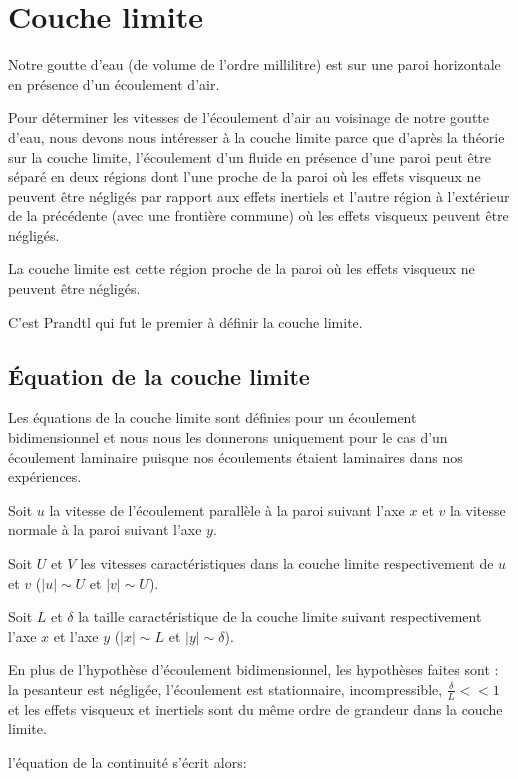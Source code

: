 \documentclass[french]{article}
\begin{document}
 
\section{Couche limite}
Notre goutte d'eau (de volume de l'ordre millilitre) est sur une paroi horizontale en présence d'un écoulement d'air.


Pour déterminer les vitesses de l'écoulement d'air au voisinage de notre goutte d'eau, nous devons nous intéresser à la couche limite parce que d'après la théorie sur la couche limite, l'écoulement d'un fluide en présence d'une paroi peut être séparé en deux régions dont l'une proche de la paroi où les effets visqueux ne peuvent être négligés par rapport aux effets inertiels et l'autre région à l'extérieur de la précédente (avec une frontière commune) où les effets visqueux peuvent être négligés.

La couche limite est cette région proche de la paroi où les effets visqueux ne peuvent être négligés.

C'est Prandtl qui fut le premier à définir la couche limite. 

\subsection{Équation de la couche limite }

Les équations de la couche limite sont définies pour un écoulement bidimensionnel et nous nous les donnerons uniquement pour le cas d'un écoulement laminaire puisque nos écoulements étaient laminaires dans nos expériences.

Soit $u$ la vitesse de l'écoulement parallèle à la paroi suivant l'axe $x$ et $v$ la vitesse normale à la paroi suivant l'axe $y$.

Soit $U$ et $V$ les vitesses caractéristiques dans la couche limite respectivement de $u$ et $v$ ($\left| u \right| \sim U$ et $\left| v \right| \sim U$).

Soit $L$ et $\delta$ la taille caractéristique de la couche limite suivant respectivement l'axe $x$ et l'axe $y$ ($\left| x \right| \sim L$ et $\left| y \right| \sim \delta$).

En plus de l'hypothèse d'écoulement bidimensionnel, les hypothèses faites sont : la pesanteur est négligée, l'écoulement est stationnaire, incompressible, $\frac{\delta}{L} << 1$ et les effets visqueux et inertiels sont du même ordre de grandeur dans la couche limite.



l'équation de la continuité s'écrit alors:
\end{document}

